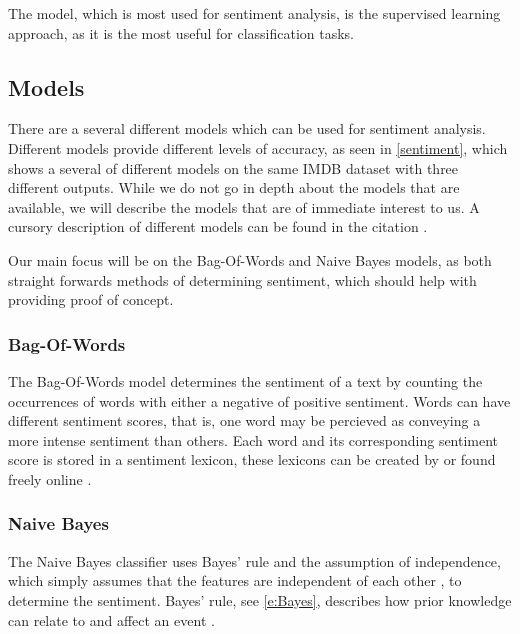 The model, which is most used for sentiment analysis, is the supervised learning
approach, as it is the most useful for classification tasks.

\subsection{Models}\label{subsub:Models}

There are a several different models which can be used for sentiment analysis. 
Different models provide different levels of accuracy, as seen in
\autoref{sentiment}, which shows a several of different models on the same IMDB
dataset with three different outputs. While we do not go in depth about the
models that are available, we will describe the models that are of
immediate interest to us. A cursory description of different models can be
found in the citation \citep{Classification}.


Our main focus will be on the Bag-Of-Words and Naive Bayes models, as both
straight forwards methods of determining sentiment, which should help with
providing proof of concept.

\subsubsection{Bag-Of-Words}
The Bag-Of-Words model determines the sentiment of a text by
counting the occurrences of words with either a negative of positive sentiment.
Words can have different sentiment scores, that is, one word may be percieved
as conveying a more intense sentiment than others. Each word and its
corresponding sentiment score is stored in a sentiment lexicon, these lexicons
can be created by or found freely online \citep{BagOfWords}.



\subsubsection{Naive Bayes} 
The Naive Bayes classifier uses Bayes' rule and the assumption of independence,
which simply assumes that the features are independent of each other
\citep[Proposition 6.5]{MIBook}, to determine the sentiment. Bayes' rule, see
\autoref{e:Bayes}, describes how prior knowledge can relate to and affect an
event \citep[P.229]{MIBook}. 

